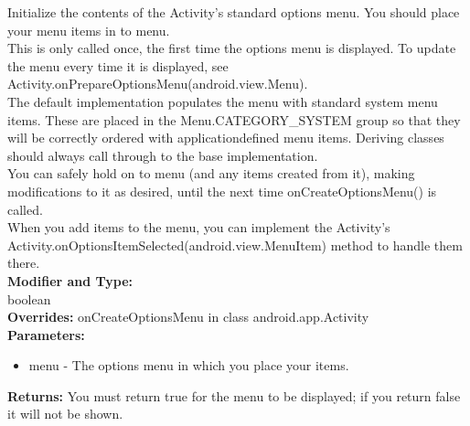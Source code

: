 Initialize the contents of the Activity's standard options menu. You should place your menu items in to menu.\\

This is only called once, the first time the options menu is displayed. To update the menu every time it is displayed, see Activity.onPrepareOptionsMenu(android.view.Menu).\\

The default implementation populates the menu with standard system menu items. These are placed in the Menu.CATEGORY\_SYSTEM group so that they will be correctly ordered with application\-defined menu items. Deriving classes should always call through to the base implementation.\\

You can safely hold on to menu (and any items created from it), making modifications to it as desired, until the next time onCreateOptionsMenu() is called.\\

When you add items to the menu, you can implement the Activity's Activity.onOptionsItemSelected(android.view.MenuItem) method to handle them there.\\

\textbf{Modifier and Type:}\\
\tab boolean\\

\textbf{Overrides:}
\tab                onCreateOptionsMenu in class android.app.Activity\\

\textbf{Parameters:}
\begin{itemize}
\item menu - The options menu in which you place your items.
\end{itemize}

\textbf{Returns:}
\tab                You must return true for the menu to be displayed; if you return false it will not be shown.\\


